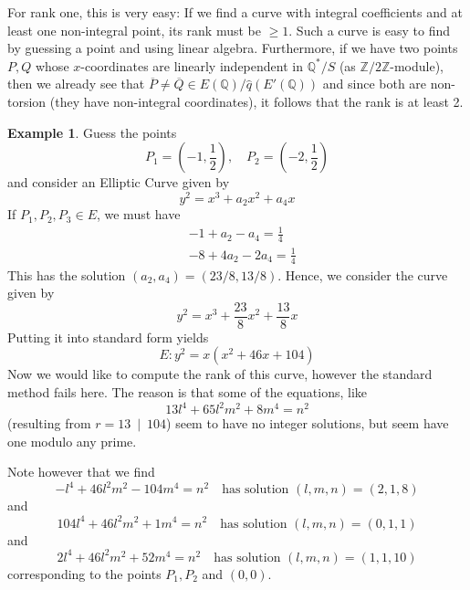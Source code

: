 \documentclass{scrartcl}
\newcommand{\Z}{\mathbb{Z}}
\newcommand{\Q}{\mathbb{Q}}
\newcommand{\divides}{\ \mid \ }
\theoremstyle{definition}
\newtheorem{example}[subsection]{Example}
\begin{document}
For rank one, this is very easy: If we find a curve with integral coefficients and at least one non-integral point, its rank must be $\geq 1$.
Such a curve is easy to find by guessing a point and using linear algebra.
Furthermore, if we have two points $P, Q$ whose $x$-coordinates are linearly independent in $\Q^*/S$ (as $\Z/2\Z$-module), then we already see that $\overline{P} \neq \overline{Q} \in E(\Q)/\hat{q}(E'(\Q))$ and since both are non-torsion (they have non-integral coordinates), it follows that the rank is at least 2.
\begin{example}
    Guess the points
    \begin{equation*}
        P_1 = \left(-1, \frac 1 2\right), \quad P_2 = \left(-2, \frac 1 2\right)
    \end{equation*}
    and consider an Elliptic Curve given by
    \begin{equation*}
        y^2 = x^3 + a_2 x^2 + a_4 x
    \end{equation*}
    If $P_1, P_2, P_3 \in E$, we must have
    \begin{align*}
        &-1 + a_2 - a_4 = \frac 1 4 \\
        &-8 + 4a_2 - 2a_4 = \frac 1 4
    \end{align*}
    This has the solution $(a_2, a_4) = (23/8, 13/8)$.
    Hence, we consider the curve given by
    \begin{equation*}
        y^2 = x^3 + \frac {23} 8 x^2 + \frac {13} 8 x
    \end{equation*}
    Putting it into standard form yields
    \begin{equation*}
        E: y^2 = x(x^2 + 46 x + 104)
    \end{equation*}
    Now we would like to compute the rank of this curve, however the standard method fails here.
    The reason is that some of the equations, like
    \begin{equation*}
        13 l^4 + 65 l^2 m^2 + 8 m^4 = n^2
    \end{equation*}
    (resulting from $r = 13 \divides 104$) seem to have no integer solutions, but seem have one modulo any prime.

    Note however that we find
    \begin{equation*}
        -l^4 + 46 l^2 m^2 - 104 m^4 = n^2 \quad \text{has solution $(l, m, n) = (2, 1, 8)$}
    \end{equation*}
    and
    \begin{equation*}
        104 l^4 + 46 l^2 m^2 + 1 m^4 = n^2 \quad \text{has solution $(l, m, n) = (0, 1, 1)$}
    \end{equation*}
    and
    \begin{equation*}
        2 l^4 + 46 l^2 m^2 + 52 m^4 = n^2 \quad \text{has solution $(l, m, n) = (1, 1, 10)$}
    \end{equation*}
    corresponding to the points $P_1, P_2$ and $(0, 0)$.


\end{example}
\end{document}
